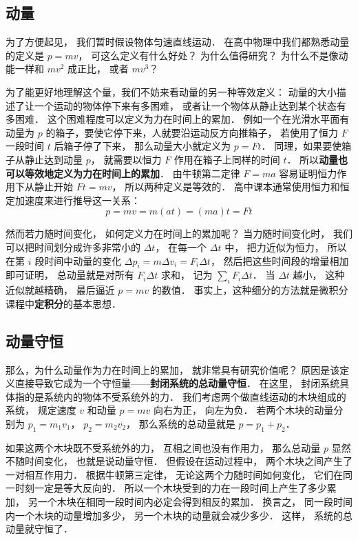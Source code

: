 

\subsection{动量}
为了方便起见， 我们暂时假设物体匀速直线运动． 在高中物理中我们都熟悉动量的定义是 $p = mv$， 可这么定义有什么好处？ 为什么值得研究？ 为什么不是像动能一样和 $mv^2$ 成正比， 或者 $mv^3$？

为了能更好地理解这个量，我们不妨来看动量的另一种等效定义： 动量的大小描述了让一个运动的物体停下来有多困难， 或者让一个物体从静止达到某个状态有多困难． 这个困难程度可以定义为力在时间上的累加． 例如一个在光滑水平面有动量为 $p$ 的箱子，要使它停下来，人就要沿运动反方向推箱子， 若使用了恒力 $F$ 一段时间 $t$ 后箱子停了下来， 那么动量大小就定义为 $p = Ft$．%
同理，如果要使箱子从静止达到动量 $p$， 就需要以恒力 $F$ 作用在箱子上同样的时间 $t$． 所以\textbf{动量也可以等效地定义为力在时间上的累加}． 由牛顿第二定律 $F = ma$ 容易证明恒力作用下从静止开始 $Ft = mv$， 所以两种定义是等效的． 高中课本通常使用恒力和恒定加速度来进行推导这一关系：
\begin{equation}
p = mv = m(at) = (ma)t = Ft
\end{equation}

然而若力随时间变化， 如何定义力在时间上的累加呢？ 当力随时间变化时， 我们可以把时间划分成许多非常小的 $\Delta t$， 在每一个 $\Delta t$ 中， 把力近似为恒力， 所以在第 $i$ 段时间中动量的变化 $\Delta p_i = m\Delta v_i = F_i\Delta t$， 然后把这些时间段的增量相加即可证明， 总动量就是对所有 $F_i\Delta t$ 求和， 记为 $\sum_i F_i \Delta t$． 当 $\Delta t$ 越小， 这种近似就越精确， 最后逼近 $p = mv$ 的数值． 事实上，这种细分的方法就是微积分课程中\textbf{定积分}的基本思想．

\subsection{动量守恒}
那么，为什么动量作为力在时间上的累加， 就非常具有研究价值呢？ 原因是该定义直接导致它成为一个守恒量——\textbf{封闭系统的总动量守恒}． 在这里， 封闭系统具体指的是系统内的物体不受系统外的力． 我们考虑两个做直线运动的木块组成的系统， 规定速度 $v$ 和动量 $p = mv$ 向右为正， 向左为负． 若两个木块的动量分别为 $p_1 = m_1 v_1$， $p_2 = m_2 v_2$， 那么系统的总动量就是 $p = p_1 + p_2$．

如果这两个木块既不受系统外的力， 互相之间也没有作用力， 那么总动量 $p$ 显然不随时间变化， 也就是说动量守恒． 但假设在运动过程中， 两个木块之间产生了一对相互作用力． 根据牛顿第三定律， 无论这两个力随时间如何变化， 它们在同一时刻一定是等大反向的． 所以一个木块受到的力在一段时间上产生了多少累加， 另一个木块在相同一段时间内必定会得到相反的累加． 换言之， 同一段时间内一个木块的动量增加多少， 另一个木块的动量就会减少多少． 这样， 系统的总动量就守恒了．

